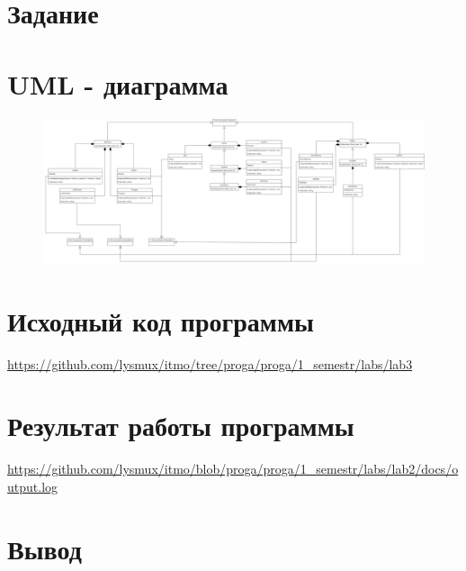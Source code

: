 


	
	
	\tableofcontents
	\newpage
	
	\section*{Задание}
	
	
	\section*{UML - диаграмма}
	\begin{figure}[h]
		\centering
		\hspace*{-2cm}
		\includegraphics[scale=0.19]{uml}
	\end{figure}
	
	\section*{Исходный код программы}
	\url{https://github.com/lysmux/itmo/tree/proga/proga/1_semestr/labs/lab3}
	
	\section*{Результат работы программы}
	\url{https://github.com/lysmux/itmo/blob/proga/proga/1_semestr/labs/lab2/docs/output.log}
	
	\section*{Вывод}
	
	

